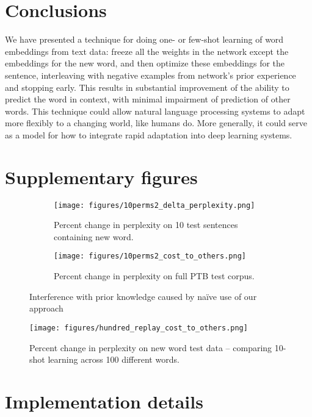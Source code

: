 \documentclass{article}
\begin{document}
\section{Conclusions}
We have presented a technique for doing one- or few-shot learning of word embeddings from text data: freeze all the weights in the network except the embeddings for the new word, and then optimize these embeddings for the sentence, interleaving with negative examples from network's prior experience and stopping early. This results in substantial improvement of the ability to predict the word in context, with minimal impairment of prediction of other words. This technique could allow natural language processing systems to adapt more flexibly to a changing world, like humans do. More generally, it could serve as a model for how to integrate rapid adaptation into deep learning systems. \par 


\newpage
\appendix
\section{Supplementary figures} \label{supp_fig_appdx}

\begin{figure}[H]
\centering
\begin{subfigure}[b]{\textwidth}
\texttt{[image: figures/10perms2\_delta\_perplexity.png]}
\caption{Percent change in perplexity on 10 test sentences containing new word.}
\end{subfigure}
\begin{subfigure}[b]{\textwidth}
\texttt{[image: figures/10perms2\_cost\_to\_others.png]}
\caption{Percent change in perplexity on full PTB test corpus.}
\end{subfigure}
\caption{Interference with prior knowledge caused by na\"{i}ve use of our approach}
\label{interference_fig}
\end{figure}

\begin{figure}
\texttt{[image: figures/hundred\_replay\_cost\_to\_others.png]}
\caption{Percent change in perplexity on new word test data -- comparing 10-shot learning across 100 different words.}
\label{hundred_word_cost_figure}
\end{figure}

\section{Implementation details} \label{methods_appdx}
\end{document}
